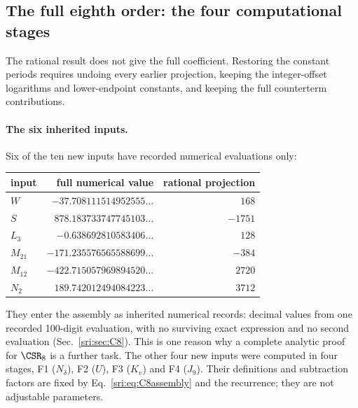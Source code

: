\subsection{The full eighth order: the four computational stages}\label{sri:app:dualC:C8packages}
The rational result does not give the full coefficient. Restoring the constant periods requires undoing every earlier
projection, keeping the integer-offset logarithms and lower-endpoint constants, and keeping the full counterterm
contributions.

\paragraph{The six inherited inputs.} Six of the ten new inputs have recorded numerical evaluations only:
\begin{center}\small
\begin{tabular}{@{}lrr@{}}
\toprule
input & full numerical value & rational projection\\
\midrule
$W$ & $-37.708111514952555\ldots$ & $168$\\
$S$ & $878.183733747745103\ldots$ & $-1751$\\
$L_3$ & $-0.638692810583406\ldots$ & $128$\\
$M_{21}$ & $-171.235576565588699\ldots$ & $-384$\\
$M_{12}$ & $-422.715057969894520\ldots$ & $2720$\\
$N_2$ & $189.742012494084223\ldots$ & $3712$\\
\bottomrule
\end{tabular}
\end{center}
They enter the assembly as inherited numerical records: decimal values from one recorded 100-digit evaluation, with no
surviving exact expression and no second evaluation (Sec.~\ref{sri:sec:C8}). This is one reason why a complete analytic
proof for $\CSR_8$ is a further task. The other four new inputs were computed in four stages, F1 ($N_\delta$), F2
($U$), F3 ($K_v$) and F4 ($J_9$). Their definitions and subtraction factors are fixed by Eq.~\eqref{sri:eq:C8assembly}
and the recurrence; they are not adjustable parameters.

